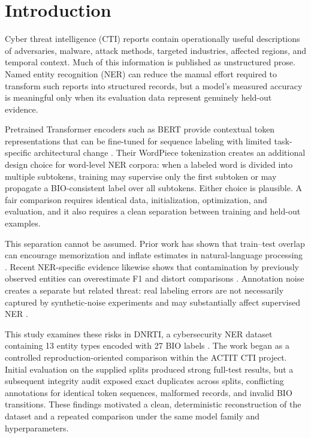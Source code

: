 \documentclass[conference]{IEEEtran}
\begin{document}
\section{Introduction}
Cyber threat intelligence (CTI) reports contain operationally useful descriptions of adversaries, malware, attack methods, targeted industries, affected regions, and temporal context. Much of this information is published as unstructured prose. Named entity recognition (NER) can reduce the manual effort required to transform such reports into structured records, but a model's measured accuracy is meaningful only when its evaluation data represent genuinely held-out evidence.

Pretrained Transformer encoders such as BERT provide contextual token representations that can be fine-tuned for sequence labeling with limited task-specific architectural change \cite{devlin2019bert}. Their WordPiece tokenization creates an additional design choice for word-level NER corpora: when a labeled word is divided into multiple subtokens, training may supervise only the first subtoken or may propagate a BIO-consistent label over all subtokens. Either choice is plausible. A fair comparison requires identical data, initialization, optimization, and evaluation, and it also requires a clean separation between training and held-out examples.

This separation cannot be assumed. Prior work has shown that train--test overlap can encourage memorization and inflate estimates in natural-language processing \cite{elanggovan2021memorization,lee2022deduplicating}. Recent NER-specific evidence likewise shows that contamination by previously observed entities can overestimate F1 and distort comparisons \cite{babl2025random}. Annotation noise creates a separate but related threat: real labeling errors are not necessarily captured by synthetic-noise experiments and may substantially affect supervised NER \cite{merdjanovska2024noisebench}.

This study examines these risks in DNRTI, a cybersecurity NER dataset containing 13 entity types encoded with 27 BIO labels \cite{dnrti2020}. The work began as a controlled reproduction-oriented comparison within the ACTIT CTI project. Initial evaluation on the supplied splits produced strong full-test results, but a subsequent integrity audit exposed exact duplicates across splits, conflicting annotations for identical token sequences, malformed records, and invalid BIO transitions. These findings motivated a clean, deterministic reconstruction of the dataset and a repeated comparison under the same model family and hyperparameters.
\end{document}
